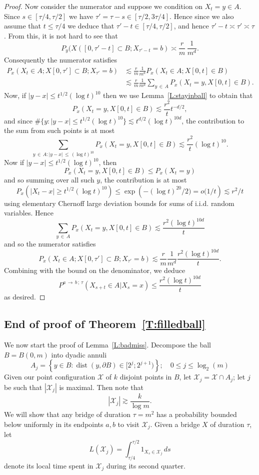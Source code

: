 \documentclass[10pt]{amsart}
\theoremstyle{definition}\newtheorem{defi}[theo]{Definition}\newtheorem{rema}[theo]{Remark}\newtheorem{exam}[theo]{Example}\newtheorem{exem}[theo]{Example}\newtheorem{nota}[theo]{Notation}
\DeclareMathOperator{\dist}{dist}
\newcommand{\Pmh}{P}
\newcommand{\cX}{\mathcal{X}}
\begin{document}
\begin{proof}
Now consider the numerator and suppose we condition on $X_t = y \in A$. Since $s \in [\tau/4, \tau/2]$ we have $\tau' = \tau - s \in [\tau/2, 3\tau/4]$. Hence since we also assume that $t \le \tau/4$ we deduce that $\tau' - t \in [\tau/4, \tau/2]$, and hence $\tau' - t \asymp \tau' \asymp \tau$. From this, it is not hard to see that
\[
\Pmh_y(X([0, \tau' - t] \subset B; X_{\tau' - t} = b) \asymp \frac{r}{m}\,\frac1{m^d}.
\]
Consequently the numerator satisfies
\begin{align*}
\Pmh_x(X_t \in A ; X[0, \tau'] \subset B ; X_{\tau'} = b) &\lesssim \frac{r}{m}\frac1{m^d} \Pmh_x(X_t \in A ; X[0,t] \in B)\\
&\lesssim \frac{r}{m} \frac1{m^d} \sum_{y\,\in\,A} \Pmh_x(X_t = y, X[0, t] \in B).
\end{align*}
Now, if $| y - x | \le t^{1/2} (\log t)^{10}$ then we use Lemma~\ref{L:stayinball} to obtain that
\[
\Pmh_x(X_t = y, X[0, t] \in B) \lesssim \frac{r^2}{t} t^{ - d/2},
\]
and since $\#\{ y : | y - x | \le t^{1/2} (\log t)^{10} \} \lesssim t^{d/2} (\log t)^{10d}$, the contribution to the sum from such points is at most
\[
\sum_{ y\,\in\,A: | y - x|\,\le\,(\log t)^{10}} \Pmh_x(X_t = y, X[0, t] \in B) \lesssim \frac{r^2}{t} (\log t)^{10}.
\]
Now if $ | y - x | \le t^{1/2} (\log t)^{10}$, then
\[
\Pmh_x(X_t = y, X[0, t] \in B) \le \Pmh_x (X_t = y)
\]
and so summing over all such $y$, the contribution is at most
\[
\Pmh_x \left(|X_t - x | \ge t^{1/2} (\log t)^{10}\right) \le \exp\left(- (\log t)^{20}/2) = o(1/t\right) \lesssim r^2/t
\]
using elementary Chernoff large deviation bounds for sums of i.i.d. random variables. Hence
\[
\sum_{ y\,\in\,A} \Pmh_x(X_t = y, X[0, t] \in B) \lesssim \frac{r^2(\log t)^{10d}}{t}
\]
and so the numerator satisfies
\[
\Pmh_x(X_t \in A ; X[0, \tau'] \subset B ; X_{\tau'} = b) \lesssim \frac{r}{m} \frac1{m^d} \frac{r^2(\log t)^{10d}}{t}.
\]
Combining with the bound on the denominator, we deduce
\[
\Pmh^{a\,\to\,b\,;\,\tau}(X_{s+t} \in A |X_s=x) \le \frac{r^2(\log t)^{10d}}{t}
\]
as desired.
\end{proof}

\subsection{End of proof of Theorem~\ref{T:filledball}}\label{S:moment}

We now start the proof of Lemma~\ref{L:badmiss}. Decompose the ball $B = B(0,m)$ into dyadic annuli
\[
A_j = \left\{ y \in B :{\dist (y, \partial B)} \in [2^j; 2^{j+1})\right\}
; \quad 0 \le j \le \log_2(m)
\]
Given our point configuration $\cX$ of $k$ disjoint points in $B$, let $\cX_j = \cX \cap A_j$; let $j$ be such that $|\cX_j|$ is maximal. Then note that
\[
|\cX_j| \gtrsim \frac{k}{\log m}.
\]
We will show that any bridge of duration $\tau = m^2$ has a probability bounded below uniformly in its endpoints $a,b$ to visit $\cX_j$. Given a bridge $X$ of duration $\tau$, let
\[
L (\cX_j) = \int_{\tau/4}^{\tau/2} 1_{X_s \in \cX_j}\,ds
\]
denote its local time spent in $\cX_j$ during its second quarter.
\end{document}
